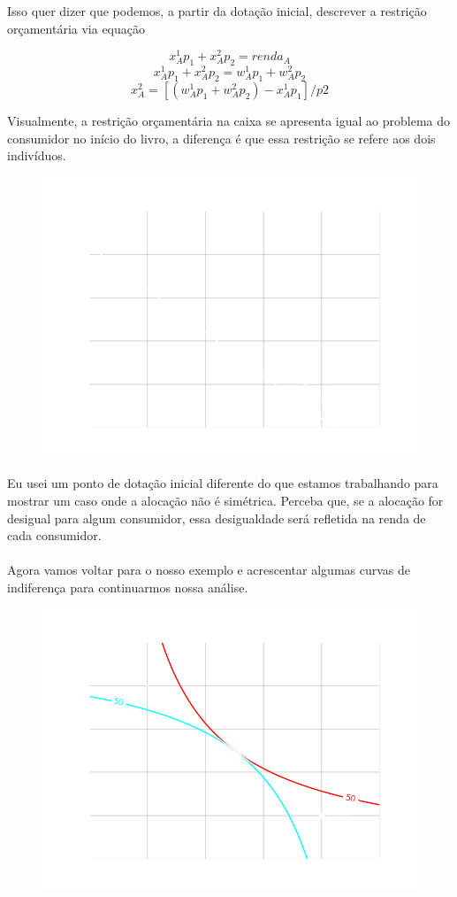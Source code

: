 \documentclass[a4paper,11pt,oneside]{book}
\theoremstyle{definition}
\theoremstyle{break}
\begin{document}
Isso quer dizer que podemos, a partir da dotação inicial, descrever a restrição orçamentária via equação

$$ x_A^1 p_1 + x_A^2 p_2 = renda_A$$
$$ x_A^1 p_1 + x_A^2 p_2 = w_A^1 p_1 + w_A^2 p_2$$
$$ x_A^2 = [(w_A^1 p_1 + w_A^2 p_2) - x_A^1 p_1]/p2$$

Visualmente, a restrição orçamentária na caixa se apresenta igual ao problema do consumidor no início do livro, a diferença é que essa restrição se refere aos dois indivíduos.

\begin{figure}[H]
\centering
\includegraphics[scale=0.6]{cap32_4-caixa_edgeworth_1.png}
\end{figure}

Eu usei um ponto de dotação inicial diferente do que estamos trabalhando para mostrar um caso onde a alocação não é simétrica. Perceba que, se a alocação for desigual para algum consumidor, essa desigualdade será refletida na renda de cada consumidor. 
\\
\\
Agora vamos voltar para o nosso exemplo e acrescentar algumas curvas de indiferença para continuarmos nossa análise.

\begin{figure}[H]
\centering
\includegraphics[scale=0.6]{cap32_4-caixa_edgeworth_2.png}
\end{figure}
\end{document}
